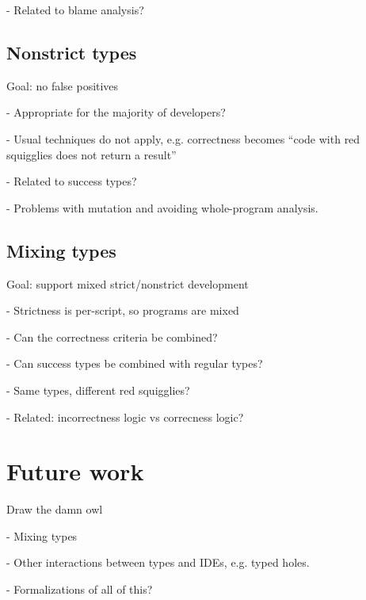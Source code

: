 \documentclass[acmsmall]{acmart}
\begin{document}
- Related to blame analysis?

\subsection{Nonstrict types}

Goal: no false positives

- Appropriate for the majority of developers?

- Usual techniques do not apply, e.g. correctness becomes ``code with red squigglies does not return a result''

- Related to success types?

- Problems with mutation and avoiding whole-program analysis.

\subsection{Mixing types}

Goal: support mixed strict/nonstrict development

- Strictness is per-script, so programs are mixed

- Can the correctness criteria be combined?

- Can success types be combined with regular types?

- Same types, different red squigglies?

- Related: incorrectness logic vs correcness logic?

\section{Future work}

Draw the damn owl

- Mixing types

- Other interactions between types and IDEs, e.g. typed holes.

- Formalizations of all of this?

 
\end{document}
